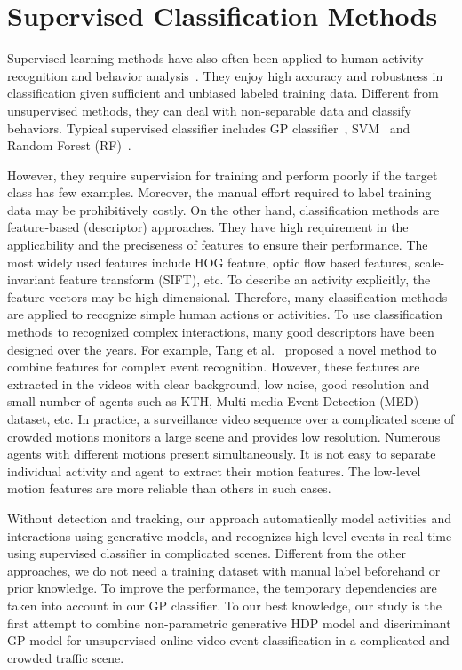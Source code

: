 \section{Supervised Classification Methods}
\label{related:classifier}
Supervised learning methods have also often been applied to human activity recognition and behavior analysis~\cite{kim2011gaussian, wang2008gaussian, deng2014cross}. They enjoy high accuracy and robustness in classification given sufficient and unbiased labeled training data. Different from unsupervised methods, they can deal with non-separable data and classify behaviors. Typical supervised classifier includes GP classifier~\cite{althloothi2014human}, SVM~\cite{deng2014cross} and Random Forest (RF)~\cite{baumann2013action}.

However, they require supervision for training and perform poorly if the target class has few examples. Moreover, the manual effort required to label training data may be prohibitively costly. On the other hand, classification methods are feature-based (descriptor) approaches. They have high requirement in the applicability and the preciseness of features to ensure their performance. The most widely used features include HOG feature, optic flow based features, scale-invariant feature transform (SIFT), etc. To describe an activity explicitly, the feature vectors may be high dimensional.
Therefore, many classification methods are applied to recognize simple human actions or activities.
To use classification methods to recognized complex interactions, many good descriptors have been designed over the years. For example, Tang et al.~\cite{tang2013combining} proposed a novel method to combine features for complex event recognition.
However, these features are extracted in the videos with clear background, low noise, good resolution and small number of agents such as KTH, Multi-media Event Detection (MED) dataset, etc. 
In practice, a surveillance video sequence over a complicated scene of crowded motions monitors a large scene and provides low resolution. Numerous agents with different motions present simultaneously. It is not easy to separate individual activity and agent to extract their motion features. The low-level motion features are more reliable than others in such cases.

Without detection and tracking, our approach automatically model activities and interactions using generative models, and recognizes high-level events in real-time using supervised classifier in complicated scenes. Different from the other approaches, we do not need a training dataset with manual label beforehand or prior knowledge. 
To improve the performance, the temporary dependencies are taken into account in our GP classifier.
To our best knowledge, our study is the first attempt to combine non-parametric generative HDP model and discriminant GP model for unsupervised online video event classification in a complicated and crowded traffic scene. 
